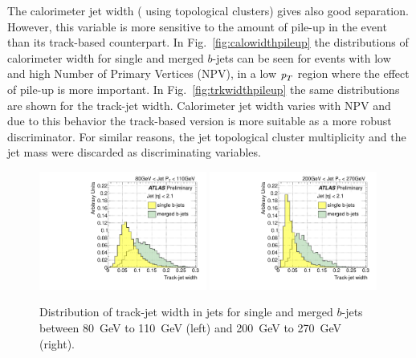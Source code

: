 The calorimeter jet width ( using topological clusters) gives also good separation. However, this variable is more sensitive to the amount of pile-up in the event than its track-based counterpart. In Fig.~\ref{fig:calowidthpileup} the distributions of calorimeter width for single and merged $b$-jets  can be seen for events with low and high Number of Primary Vertices (NPV), in a low ${\emph{p}_{T}}$ region where the effect of pile-up is more important. In Fig.~\ref{fig:trkwidthpileup} the same distributions are shown for the track-jet width. Calorimeter jet width varies %
with NPV and due to this behavior the track-based version is more suitable as a more robust discriminator. For similar reasons, the jet topological cluster multiplicity and the jet mass were discarded as discriminating variables.
\\[3mm]

\begin{figure}[tp]
\centering
\includegraphics[width=0.49\textwidth]{FIGS/VarsSingleMerged/trkWidth080.pdf}
\includegraphics[width=0.49\textwidth]{FIGS/VarsSingleMerged/trkWidth200.pdf}
\caption{Distribution of track-jet width in jets for single and merged $b$-jets between 80~GeV to 110~GeV (left) and 200~GeV to 270~GeV (right).}
\label{fig:trkwidthsinglemerged}
\end{figure}

